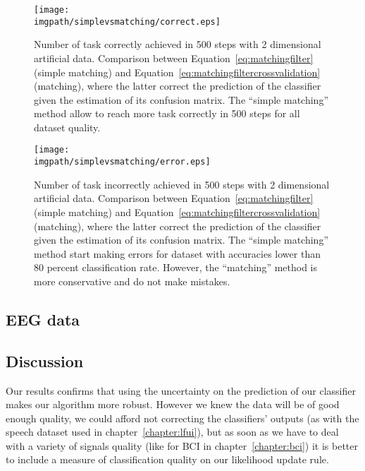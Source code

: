 \begin{figure}[!ht]
\centering
\texttt{[image: \\imgpath/simplevsmatching/correct.eps]}
\caption{Number of task correctly achieved in 500 steps with 2 dimensional artificial data. Comparison between Equation~\ref{eq:matchingfilter} (simple matching) and Equation~\ref{eq:matchingfiltercrossvalidation} (matching), where the latter correct the prediction of the classifier given the estimation of its confusion matrix. The ``simple matching'' method allow to reach more task correctly in 500 steps for all dataset quality.
}
\label{fig:nCorrect_simplevsmatching}
\end{figure} 

\begin{figure}[!ht]
\centering
\texttt{[image: \\imgpath/simplevsmatching/error.eps]}
\caption{Number of task incorrectly achieved in 500 steps with 2 dimensional artificial data. Comparison between Equation~\ref{eq:matchingfilter} (simple matching) and Equation~\ref{eq:matchingfiltercrossvalidation} (matching), where the latter correct the prediction of the classifier given the estimation of its confusion matrix. The ``simple matching'' method start making errors for dataset with accuracies lower than 80 percent classification rate. However, the ``matching'' method is more conservative and do not make mistakes.}
\label{fig:nWrongEEG_simplevsmatching}
\end{figure} 

\transition


\subsection{EEG data}


\subsection{Discussion}

Our results confirms that using the uncertainty on the prediction of our classifier makes our algorithm more robust. However we knew the data will be of good enough quality, we could afford not correcting the classifiers' outputs (as with the speech dataset used in chapter~\ref{chapter:lfui}), but as soon as we have to deal with a variety of signals quality (like for BCI in chapter~\ref{chapter:bci}) it is better to include a measure of classification quality on our likelihood update rule.